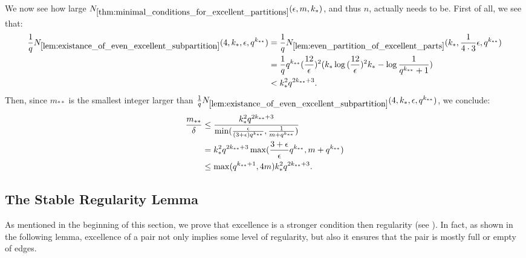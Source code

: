         \begin{remark}
            We now see how large $N_{\ref{thm:minimal_conditions_for_excellent_partitions}}( \epsilon, m, k_* )$, and thus $n$, actually needs to be.
            First of all, we see that:
            \begin{align*}
                \frac{1}{q} N_{\ref{lem:existance_of_even_excellent_subpartition}}( 4, k_*, \epsilon, q^{k_{**}} )
                    & = \frac{1}{q} N_{\ref{lem:even_partition_of_excellent_parts}}( k_*, \frac{1}{4 \cdot 3} \epsilon, q^{k_{**}} ) \\
                    & = \frac{1}{q} q^{k_{**}} ( \frac{12}{\epsilon} )^2
                        ( k_* \log{( \frac{12}{\epsilon} )^2 k_*} - \log{\frac{1}{q^{k_{**}}+1}} ) \\
                    & < k_*^2 q^{2 k_{**} + 3}.
            \end{align*}
            Then, since $m_{**}$ is the smallest integer larger than $\frac{1}{q} N_{\ref{lem:existance_of_even_excellent_subpartition}}( 4, k_*, \epsilon, q^{k_{**}} )$,
            we conclude:
            \begin{align*}
                \frac{m_{**}}{\delta}
                    & \leq \frac{k_*^2 q^{2 k_{**} + 3}}
                        {\min ( \frac{\epsilon}{( 3 + \epsilon ) q^{k_{**}}}, \frac{1}{m + q^{k_{**}}} )} \\
                    & = k_*^2 q^{2 k_{**} + 3} \max ( \frac{3 + \epsilon}{\epsilon} q^{k_{**}}, m + q^{k_{**}} ) \\
                    & \leq \max ( q^{k_{**} + 1}, 4m ) k_*^2 q^{2 k_{**} + 3}.
            \end{align*}
        \end{remark}

    \subsection{The Stable Regularity Lemma} \label{subsec:subsection_5.3}

        As mentioned in the beginning of this section, we prove that excellence is a stronger condition then
        regularity (see ).
        In fact, as shown in the following lemma, excellence of a pair not only implies some level of regularity, but
        also it ensures that the pair is mostly full or empty of edges.

